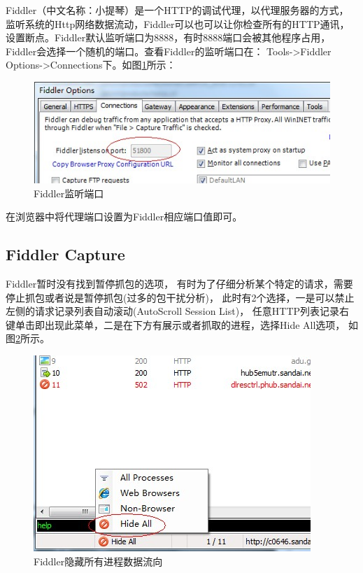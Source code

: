 \documentclass{book}
\begin{document}
Fiddler（中文名称：小提琴）是一个HTTP的调试代理，以代理服务器的方式，
监听系统的Http网络数据流动，Fiddler可以也可以让你检查所有的HTTP通讯，
设置断点。Fiddler默认监听端口为8888，有时8888端口会被其他程序占用，
Fiddler会选择一个随机的端口。查看Fiddler的监听端口在：
Tools->Fiddler Options->Connections下。如图\ref{fig:FiddlerListeningPort}所示：

\begin{figure}[htbp]
	\centering
	\includegraphics[scale=0.8]{FiddlerListeningPort.jpg}
	\caption{Fiddler监听端口}
	\label{fig:FiddlerListeningPort}
\end{figure}

在浏览器中将代理端口设置为Fiddler相应端口值即可。

\subsection{Fiddler Capture}

Fiddler暂时没有找到暂停抓包的选项，
有时为了仔细分析某个特定的请求，需要停止抓包或者说是暂停抓包(过多的包干扰分析)，
此时有2个选择，一是可以禁止左侧的请求记录列表自动滚动(AutoScroll Session List)，
任意HTTP列表记录右键单击即出现此菜单，二是在下方有展示或者抓取的进程，选择Hide All选项，
如图\ref{fig:HideAllProcessCapture}所示。

\begin{figure}[htbp]
	\centering
	\includegraphics[scale=0.5]{HideAllProcessCapture.jpg}
	\caption{Fiddler隐藏所有进程数据流向}
	\label{fig:HideAllProcessCapture}
\end{figure}
\end{document}
